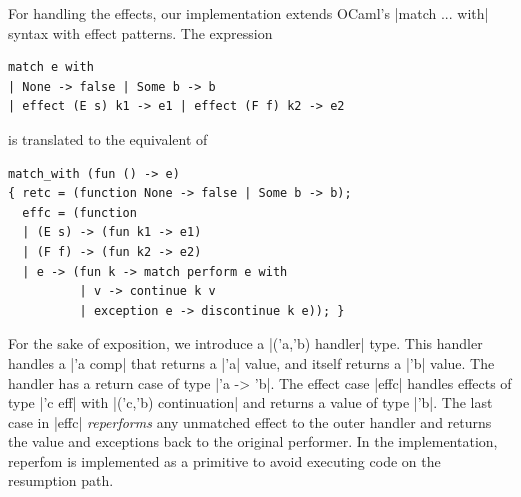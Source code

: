 \documentclass[sigplan,10pt,review,anonymous]{acmart}\settopmatter{printfolios=true,printccs=false,printacmref=false}
\begin{document}
For handling the effects, our implementation extends OCaml's |match ... with|
syntax with effect patterns. The expression
\begin{lstlisting}
match e with
| None -> false | Some b -> b
| effect (E s) k1 -> e1 | effect (F f) k2 -> e2
\end{lstlisting}
\noindent is translated to the equivalent of
\begin{lstlisting}
match_with (fun () -> e)
{ retc = (function None -> false | Some b -> b);
  effc = (function
  | (E s) -> (fun k1 -> e1)
  | (F f) -> (fun k2 -> e2)
  | e -> (fun k -> match perform e with
          | v -> continue k v
          | exception e -> discontinue k e)); }
\end{lstlisting}
For the sake of exposition, we introduce a |('a,'b) handler| type. This handler
handles a |'a comp| that returns a |'a| value, and itself returns a |'b| value.
The handler has a return case of type |'a -> 'b|. The effect case |effc|
handles effects of type |'c eff| with |('c,'b) continuation| and returns a
value of type |'b|. The last case in |effc| \emph{reperforms} any unmatched
effect to the outer handler and returns the value and exceptions back to the
original performer. In the implementation, reperfom is implemented as a
primitive to avoid executing code on the resumption path.
\end{document}
